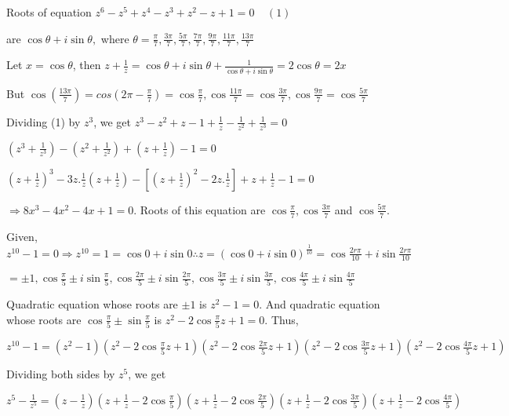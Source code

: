   Roots of equation $z^6 - z^5 + z^4 - z^3 + z^2 - z + 1 = 0\;\;\;\;(1)$

  are $\cos \theta + i \sin \theta,$ where $\theta = \frac{\pi}{7}, \frac{3\pi}{7}, \frac{5\pi}{7},
  \frac{7\pi}{7}, \frac{9\pi}{7}, \frac{11\pi}{7}, \frac{13\pi}{7}$

  Let $x = \cos \theta$, then $z + \frac{1}{z} = \cos \theta + i \sin \theta + \frac{1}{\cos \theta +
    i \sin \theta} = 2\cos\theta = 2x$

  But $\cos\left(\frac{13\pi}{7}\right) = cos\left(2\pi - \frac{\pi}{7}\right) = \cos\frac{\pi}{7},
  \cos\frac{11\pi}{7} = \cos\frac{3\pi}{7}, \cos\frac{9\pi}{7} = \cos\frac{5\pi}{7}$

  Dividing (1) by $z^3$, we get $z^3 - z^2 + z - 1 + \frac{1}{z} - \frac{1}{z^2} + \frac{1}{z^3} = 0$

  $\left(z^3 + \frac{1}{z^3}\right) - \left(z^2 + \frac{1}{z^2}\right) + \left(z + \frac{1}{z}\right) - 1 =
  0$

  $\left(z + \frac{1}{z}\right)^3 - 3z.\frac{1}{z}\left(z + \frac{1}{z}\right) - \left[\left(z +
    \frac{1}{z}\right)^2 - 2z.\frac{1}{z}\right] + z + \frac{1}{z} - 1 = 0$

  $\Rightarrow 8x^3 - 4x^2 -4x + 1 = 0$. Roots of this equation are $\cos \frac{\pi}{7}, \cos
  \frac{3\pi}{7}$ and $\cos \frac{5\pi}{7}$.
\item Given, $z^{10} - 1 = 0 \Rightarrow z^{10} = 1 = \cos 0 + i \sin 0\therefore z = (\cos 0 + i \sin
  0)^{\frac{1}{10}} = \cos\frac{2r\pi}{10} + i \sin\frac{2r\pi}{10}$

  $= \pm 1, \cos\frac{\pi}{5} \pm i\sin\frac{\pi}{5}, \cos\frac{2\pi}{5} \pm i\sin\frac{2\pi}{5},
  \cos\frac{3\pi}{5} \pm i\sin\frac{3\pi}{5}, \cos\frac{4\pi}{5} \pm i\sin\frac{4\pi}{5}$

  Quadratic equation whose roots are $\pm 1$ is $z^2 - 1 = 0$. And quadratic equation whose roots are
  $\cos\frac{\pi}{5} \pm \sin\frac{\pi}{5}$ is $z^2 - 2\cos\frac{\pi}{5}z + 1 = 0$. Thus,

  $z^{10} - 1 = (z^2 - 1)\left(z^2 - 2\cos\frac{\pi}{5}z + 1\right)\left(z^2 - 2\cos\frac{2\pi}{5}z +
  1\right)\left(z^2 - 2\cos\frac{3\pi}{5}z + 1\right)\left(z^2 - 2\cos\frac{4\pi}{5}z + 1\right)$

  Dividing both sides by $z^5$, we get

  $z^5 - \frac{1}{z^5} = \left(z - \frac{1}{z}\right)\left(z + \frac{1}{z}
  - 2\cos\frac{\pi}{5}\right)\left(z + \frac{1}{z}
  - 2\cos\frac{2\pi}{5}\right)\left(z + \frac{1}{z}
  - 2\cos\frac{3\pi}{5}\right)\left(z + \frac{1}{z}
  - 2\cos\frac{4\pi}{5}\right)$

